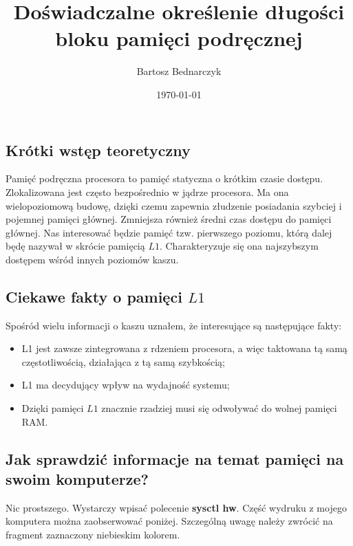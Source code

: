 \documentclass{article}
\begin{document}
 
\title{Doświadczalne określenie długości bloku pamięci podręcznej}
\date{\today}
\author{Bartosz Bednarczyk}
 
\maketitle
 
\subsection*{Krótki wstęp teoretyczny}
 
Pamięć podręczna procesora to pamięć statyczna o krótkim czasie dostępu. Zlokalizowana jest często bezpośrednio w jądrze procesora. Ma ona wielopoziomową budowę, dzięki czemu zapewnia złudzenie posiadania szybciej i pojemnej pamięci głównej. Zmniejsza również średni czas dostępu do pamięci głównej. Nas interesować będzie pamięć tzw. pierwszego poziomu, którą dalej będę nazywał w skrócie pamięcią $L1$. Charakteryzuje się ona najszybszym dostępem wśród innych poziomów kaszu.
 
\subsection*{Ciekawe fakty o pamięci $L1$}
 
Spośród wielu informacji o kaszu uznałem, że interesujące są następujące fakty:
 
\begin{itemize}
\item L1 jest zawsze zintegrowana z rdzeniem procesora, a więc taktowana tą samą częstotliwością, działająca z tą samą szybkością; 
\item  L1 ma decydujący wpływ na wydajność systemu;
\item Dzięki pamięci $L1$ znacznie rzadziej musi się odwoływać do wolnej pamięci RAM.
\end{itemize}
 
\subsection{Jak sprawdzić informacje na temat pamięci na swoim komputerze?}
 
Nic prostszego. Wystarczy wpisać polecenie \textbf{sysctl hw}. Część wydruku z mojego komputera można zaobserwować poniżej. Szczególną uwagę należy zwrócić na fragment zaznaczony niebieskim kolorem.
 
\end{document}
